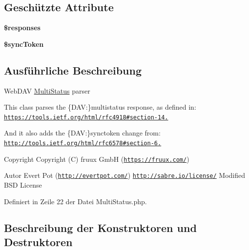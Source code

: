 \subsection*{Geschützte Attribute}
\begin{DoxyCompactItemize}
\item 
\mbox{\label{class_sabre_1_1_d_a_v_1_1_xml_1_1_response_1_1_multi_status_a1d723d2627b65a17781c0fa81c1f13cf}} 
{\bfseries \$responses}
\item 
\mbox{\label{class_sabre_1_1_d_a_v_1_1_xml_1_1_response_1_1_multi_status_aa9f82d97ccbc301a887eae47a9050d2c}} 
{\bfseries \$sync\+Token}
\end{DoxyCompactItemize}


\subsection{Ausführliche Beschreibung}
Web\+D\+AV \mbox{\hyperlink{class_sabre_1_1_d_a_v_1_1_xml_1_1_response_1_1_multi_status}{Multi\+Status}} parser

This class parses the \{D\+AV\+:\}multistatus response, as defined in\+: \href{https://tools.ietf.org/html/rfc4918#section-14.16}{\tt https\+://tools.\+ietf.\+org/html/rfc4918\#section-\/14.}

And it also adds the \{D\+AV\+:\}synctoken change from\+: \href{http://tools.ietf.org/html/rfc6578#section-6.4}{\tt http\+://tools.\+ietf.\+org/html/rfc6578\#section-\/6.}

\begin{DoxyCopyright}{Copyright}
Copyright (C) fruux GmbH (\href{https://fruux.com/}{\tt https\+://fruux.\+com/}) 
\end{DoxyCopyright}
\begin{DoxyAuthor}{Autor}
Evert Pot (\href{http://evertpot.com/}{\tt http\+://evertpot.\+com/})  \href{http://sabre.io/license/}{\tt http\+://sabre.\+io/license/} Modified B\+SD License 
\end{DoxyAuthor}


Definiert in Zeile 22 der Datei Multi\+Status.\+php.



\subsection{Beschreibung der Konstruktoren und Destruktoren}
\mbox{\label{class_sabre_1_1_d_a_v_1_1_xml_1_1_response_1_1_multi_status_a0a2ba99ea42da2ca7218aeb3e1ec59a8}} 
